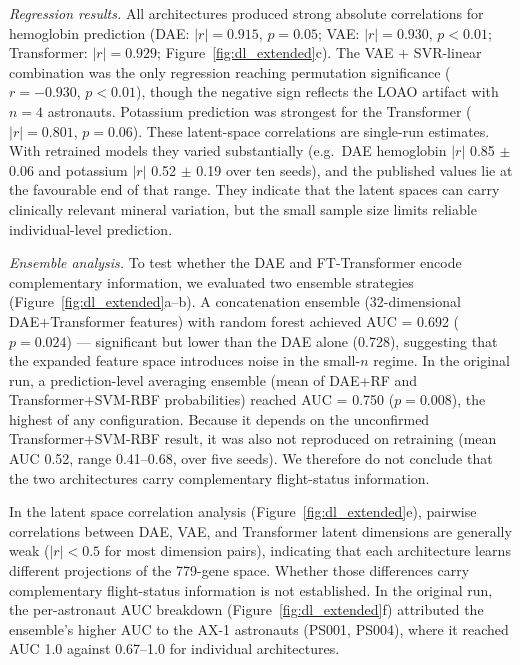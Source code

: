 \documentclass[11pt,a4paper]{article}
\begin{document}
\textit{Regression results.} All architectures produced strong absolute correlations for hemoglobin prediction (DAE: $|r| = 0.915$, $p = 0.05$; VAE: $|r| = 0.930$, $p < 0.01$; Transformer: $|r| = 0.929$; Figure~\ref{fig:dl_extended}c). The VAE + SVR-linear combination was the only regression reaching permutation significance ($r = -0.930$, $p < 0.01$), though the negative sign reflects the LOAO artifact with $n = 4$ astronauts. Potassium prediction was strongest for the Transformer ($|r| = 0.801$, $p = 0.06$). These latent-space correlations are single-run estimates. With retrained models they varied substantially (e.g.\ DAE hemoglobin $|r|$ 0.85 $\pm$ 0.06 and potassium $|r|$ 0.52 $\pm$ 0.19 over ten seeds), and the published values lie at the favourable end of that range. They indicate that the latent spaces can carry clinically relevant mineral variation, but the small sample size limits reliable individual-level prediction.

\textit{Ensemble analysis.} To test whether the DAE and FT-Transformer encode complementary information, we evaluated two ensemble strategies (Figure~\ref{fig:dl_extended}a--b). A concatenation ensemble (32-dimensional DAE+Transformer features) with random forest achieved AUC = 0.692 ($p = 0.024$) --- significant but lower than the DAE alone (0.728), suggesting that the expanded feature space introduces noise in the small-$n$ regime. In the original run, a prediction-level averaging ensemble (mean of DAE+RF and Transformer+SVM-RBF probabilities) reached AUC = 0.750 ($p = 0.008$), the highest of any configuration. Because it depends on the unconfirmed Transformer+SVM-RBF result, it was also not reproduced on retraining (mean AUC 0.52, range 0.41--0.68, over five seeds). We therefore do not conclude that the two architectures carry complementary flight-status information.

In the latent space correlation analysis (Figure~\ref{fig:dl_extended}e), pairwise correlations between DAE, VAE, and Transformer latent dimensions are generally weak ($|r| < 0.5$ for most dimension pairs), indicating that each architecture learns different projections of the 779-gene space. Whether those differences carry complementary flight-status information is not established. In the original run, the per-astronaut AUC breakdown (Figure~\ref{fig:dl_extended}f) attributed the ensemble's higher AUC to the AX-1 astronauts (PS001, PS004), where it reached AUC 1.0 against 0.67--1.0 for individual architectures.
\end{document}
